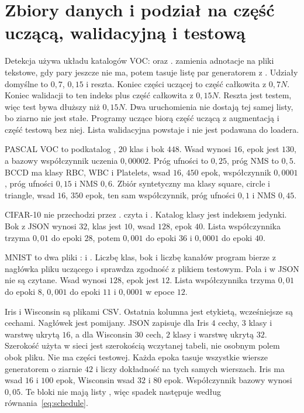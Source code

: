 \section{Zbiory danych i podział na część uczącą, walidacyjną i testową}

Detekcja używa układu katalogów VOC:  oraz .  zamienia adnotacje na pliki tekstowe, gdy pary jeszcze nie ma, potem tasuje listę par generatorem z . Udziały domyślne to \(0{,}7\), \(0{,}15\) i reszta. Koniec części uczącej to część całkowita z \(0{,}7N\). Koniec walidacji to ten indeks plus część całkowita z \(0{,}15N\). Reszta jest testem, więc test bywa dłuższy niż \(0{,}15N\). Dwa uruchomienia nie dostają tej samej listy, bo ziarno nie jest stałe. Programy uczące biorą część uczącą z augmentacją i część testową bez niej. Lista walidacyjna powstaje i nie jest podawana do loadera.

PASCAL VOC to podkatalog , \(20\) klas i bok \(448\). Wsad wynosi \(16\), epok jest \(130\), a bazowy współczynnik uczenia \(0{,}00002\). Próg ufności to \(0{,}25\), próg NMS to \(0{,}5\). BCCD ma klasy RBC, WBC i Platelets, wsad \(16\), \(450\) epok, współczynnik \(0{,}0001\), próg ufności \(0{,}15\) i NMS \(0{,}6\). Zbiór syntetyczny ma klasy square, circle i triangle, wsad \(16\), \(350\) epok, ten sam współczynnik, próg ufności \(0{,}1\) i NMS \(0{,}45\).

CIFAR-10 nie przechodzi przez .  czyta  i . Katalog klasy jest indeksem jedynki. Bok z JSON wynosi \(32\), klas jest \(10\), wsad \(128\), epok \(40\). Lista współczynnika trzyma \(0{,}01\) do epoki \(28\), potem \(0{,}001\) do epoki \(36\) i \(0{,}0001\) do epoki \(40\).

MNIST to dwa pliki :  i . Liczbę klas, bok i liczbę kanałów program bierze z nagłówka pliku uczącego i sprawdza zgodność z plikiem testowym. Pola  i  w JSON nie są czytane. Wsad wynosi \(128\), epok jest \(12\). Lista współczynnika trzyma \(0{,}01\) do epoki \(8\), \(0{,}001\) do epoki \(11\) i \(0{,}0001\) w epoce \(12\).

Iris i Wisconsin są plikami CSV. Ostatnia kolumna jest etykietą, wcześniejsze są cechami. Nagłówek jest pomijany. JSON zapisuje dla Iris \(4\) cechy, \(3\) klasy i warstwę ukrytą \(16\), a dla Wisconsin \(30\) cech, \(2\) klasy i warstwę ukrytą \(32\). Szerokość użyta w sieci jest szerokością wczytanej tabeli, nie osobnym polem obok pliku. Nie ma części testowej. Każda epoka tasuje wszystkie wiersze generatorem o ziarnie \(42\) i liczy dokładność na tych samych wierszach. Iris ma wsad \(16\) i \(100\) epok, Wisconsin wsad \(32\) i \(80\) epok. Współczynnik bazowy wynosi \(0{,}05\). Te bloki nie mają listy , więc spadek następuje według równania~\eqref{eq:schedule}.

